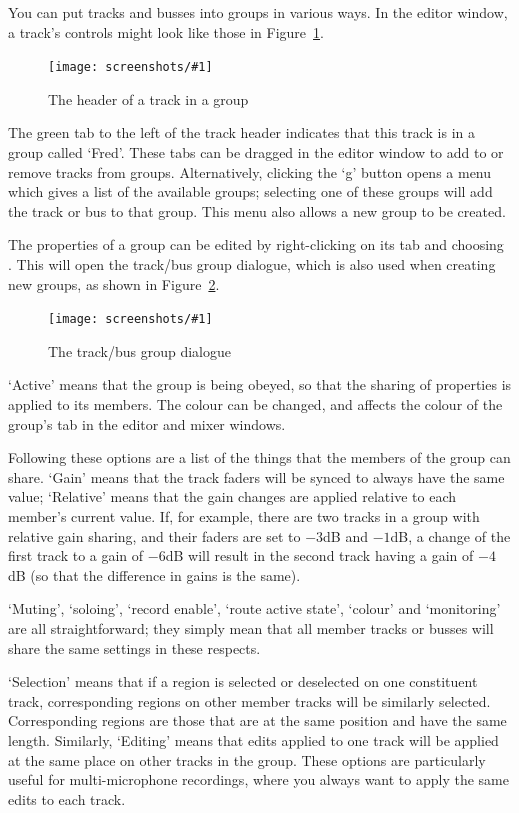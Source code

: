 \documentclass[10pt,a4paper]{book}
\newcommand{\menu}[1]{\emph{\StrSubstitute{#1}{,}{ $\rightarrow$ }}}
\newcommand{\screenshot}[3]{%
\begin{figure}[ht]%
\begin{center}
\texttt{[image: screenshots/\#1]}
\end{center}
\caption{#2}
\label{#3}
\end{figure}}
\begin{document}
{You can put tracks and busses into groups in various ways.  In the
editor window, a track's controls might look like those in
Figure~\ref{fig:track-in-group}.

\screenshot{track-in-group.png}{The header of a track in a group}{fig:track-in-group}

The green tab to the left of the track header indicates that this
track is in a group called `Fred'.  These tabs can be dragged in the
editor window to add to or remove tracks from groups.  Alternatively,
clicking the `g' button opens a menu which gives a list of the
available groups; selecting one of these groups will add the track or
bus to that group.  This menu also allows a new group to be created.

The properties of a group can be edited by right-clicking on its tab
and choosing \menu{Edit Group...}.  This will open the track/bus group
dialogue, which is also used when creating new groups, as shown in
Figure~\ref{fig:route-group-dialogue}.

\screenshot{route-group-dialogue.png}{The track/bus group dialogue}{fig:route-group-dialogue}

`Active' means that the group is being obeyed, so that the sharing of
properties is applied to its members.  The colour can be changed, and
affects the colour of the group's tab in the editor and mixer windows.

Following these options are a list of the things that the members of
the group can share.  `Gain' means that the track faders will be
synced to always have the same value; `Relative' means that the gain
changes are applied relative to each member's current value.  If, for
example, there are two tracks in a group with relative gain sharing,
and their faders are set to $-3$dB and $-1$dB, a change of the first
track to a gain of $-6$dB will result in the second track having a
gain of $-4$dB (so that the difference in gains is the same).

`Muting', `soloing', `record enable', `route active state', `colour'
and `monitoring' are all straightforward; they simply mean that all
member tracks or busses will share the same settings in these
respects.

`Selection' means that if a region is selected or deselected on one
constituent track, corresponding regions on other member tracks will
be similarly selected.  Corresponding regions are those that are at
the same position and have the same length.  Similarly, `Editing'
means that edits applied to one track will be applied at the same
place on other tracks in the group.  These options are particularly
useful for multi-microphone recordings, where you always want to apply
the same edits to each track.

}
\end{document}
